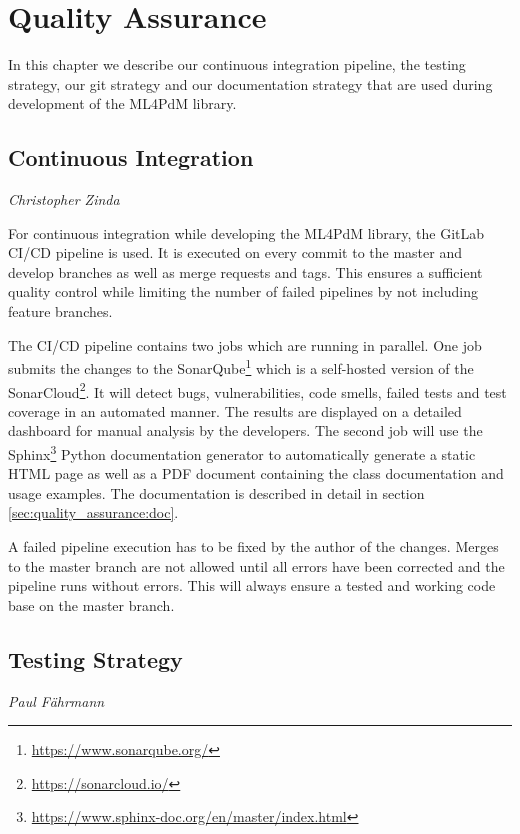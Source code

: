 %
\chapter{Quality Assurance}
\label{sec:quality_assurance}

In this chapter we describe our continuous integration pipeline, the testing strategy, our git strategy and our documentation strategy that are used during development of the ML4PdM library.

\section{Continuous Integration}
\vspace*{-10mm}\hfill{\normalsize\emph{Christopher Zinda}}
\label{sec:quality_assurance:ci}

For continuous integration while developing the ML4PdM library, the GitLab CI/CD pipeline is used. It is executed on every commit to the master and develop branches as well as merge requests and tags. This ensures a sufficient quality control while limiting the number of failed pipelines by not including feature branches.

The CI/CD pipeline contains two jobs which are running in parallel. One job submits the changes to the SonarQube\footnote{\href{https://www.sonarqube.org/}{https://www.sonarqube.org/}} which is a self-hosted version of the SonarCloud\footnote{\href{https://sonarcloud.io/}{https://sonarcloud.io/}}. It will detect bugs, vulnerabilities, code smells, failed tests and test coverage in an automated manner. The results are displayed on a detailed dashboard for manual analysis by the developers. The second job will use the Sphinx\footnote{\href{https://www.sphinx-doc.org/en/master/index.html}{https://www.sphinx-doc.org/en/master/index.html}} Python documentation generator to automatically generate a static HTML page as well as a PDF document containing the class documentation and usage examples. The documentation is described in detail in section \ref{sec:quality_assurance:doc}.

A failed pipeline execution has to be fixed by the author of the changes. Merges to the master branch are not allowed until all errors have been corrected and the pipeline runs without errors. This will always ensure a tested and working code base on the master branch.
\newpage
\section{Testing Strategy}
\vspace*{-10mm}\hfill{\normalsize\emph{Paul Fährmann}}
\label{sec:quality_assurance:testing}

